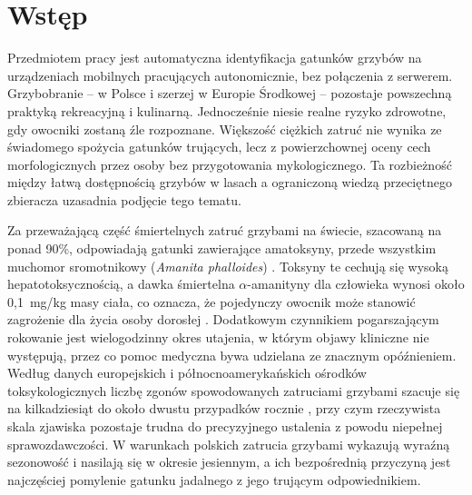 
\chapter{Wstęp}\label{chap:wstep}
Przedmiotem pracy jest automatyczna identyfikacja gatunków grzybów na urządzeniach mobilnych pracujących autonomicznie, bez połączenia z serwerem. Grzybobranie – w Polsce i szerzej w Europie Środkowej – pozostaje powszechną praktyką rekreacyjną i kulinarną. Jednocześnie niesie realne ryzyko zdrowotne, gdy owocniki zostaną źle rozpoznane. Większość ciężkich zatruć nie wynika ze świadomego spożycia gatunków trujących, lecz z powierzchownej oceny cech morfologicznych przez osoby bez przygotowania mykologicznego. Ta rozbieżność między łatwą dostępnością grzybów w lasach a ograniczoną wiedzą przeciętnego zbieracza uzasadnia podjęcie tego tematu.

Za przeważającą część śmiertelnych zatruć grzybami na świecie, szacowaną na ponad 90\%, odpowiadają gatunki zawierające amatoksyny, przede wszystkim muchomor sromotnikowy (\textit{Amanita phalloides}) \cite{garcia2015amanita, mengs2012legalon}. Toksyny te cechują się wysoką hepatotoksycznością, a dawka śmiertelna $\alpha$-amanityny dla człowieka wynosi około 0,1~mg/kg masy ciała, co oznacza, że pojedynczy owocnik może stanowić zagrożenie dla życia osoby dorosłej \cite{garcia2015amanita}. Dodatkowym czynnikiem pogarszającym rokowanie jest wielogodzinny okres utajenia, w którym objawy kliniczne nie występują, przez co pomoc medyczna bywa udzielana ze znacznym opóźnieniem. Według danych europejskich i północnoamerykańskich ośrodków toksykologicznych liczbę zgonów spowodowanych zatruciami grzybami szacuje się na kilkadziesiąt do około dwustu przypadków rocznie \cite{mengs2012legalon}, przy czym rzeczywista skala zjawiska pozostaje trudna do precyzyjnego ustalenia z powodu niepełnej sprawozdawczości. W warunkach polskich zatrucia grzybami wykazują wyraźną sezonowość i nasilają się w okresie jesiennym, a ich bezpośrednią przyczyną jest najczęściej pomylenie gatunku jadalnego z jego trującym odpowiednikiem.

